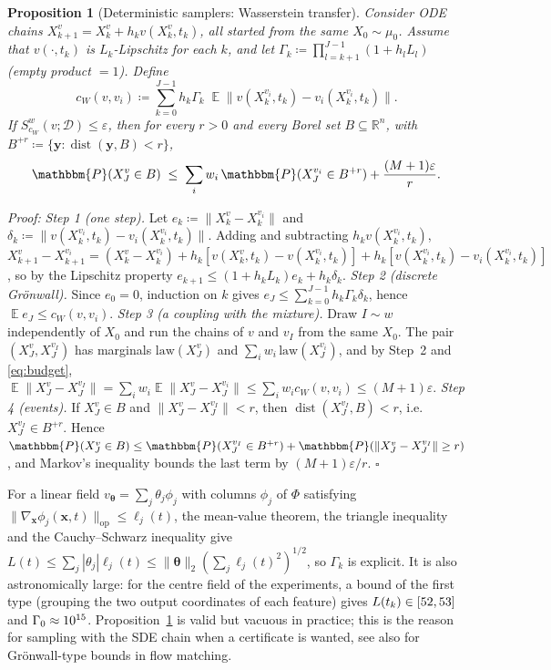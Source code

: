 \documentclass{article}
\DeclareMathOperator{\E}{\mathbb{E}}
\DeclareMathOperator{\dist}{dist}
\newcommand{\RR}{\mathbb{R}}
\newcommand{\cD}{\mathcal{D}}                       %
\newcommand{\bth}{\boldsymbol{\theta}}
\newcommand{\bx}{\mathbf{x}}
\newcommand{\by}{\mathbf{y}}
\theoremstyle{plain}
\newtheorem{proposition}{Proposition}
\begin{document}
\begin{proposition}[Deterministic samplers: Wasserstein transfer]\label{pr:ode}
Consider ODE chains $X^{v}_{k+1}=X^v_k+h_kv(X^v_k,t_k)$, all started from the same
$X_0\sim\mu_0$. Assume that $v(\cdot,t_k)$ is $L_k$-Lipschitz for each $k$, and let
$\Gamma_k\coloneqq\prod_{l=k+1}^{J-1}(1+h_lL_l)$ (empty product $=1$). Define
\[
  c_W(v,v_i)\coloneqq\sum_{k=0}^{J-1}h_k\Gamma_k\;\E\big\|v(X^{v_i}_k,t_k)-v_i(X^{v_i}_k,t_k)\big\| .
\]
If $S^w_{c_W}(v;\cD)\leq\varepsilon$, then for every $r>0$ and every Borel set $B\subseteq\RR^n$,
with $B^{+r}\coloneqq\{\by:\dist(\by,B)<r\}$,
\[
  \mathbbm{P}(X^v_J\in B)\;\leq\;\sum_iw_i\,\mathbbm{P}(X^{v_i}_J\in B^{+r})+\frac{(M+1)\varepsilon}{r}.
\]
\end{proposition}
\textit{Proof:}
\emph{Step 1 (one step).} Let $e_k\coloneqq\|X^v_k-X^{v_i}_k\|$ and
$\delta_k\coloneqq\|v(X^{v_i}_k,t_k)-v_i(X^{v_i}_k,t_k)\|$. Adding and subtracting
$h_kv(X^{v_i}_k,t_k)$,
$X^v_{k+1}-X^{v_i}_{k+1}=(X^v_k-X^{v_i}_k)+h_k[v(X^v_k,t_k)-v(X^{v_i}_k,t_k)]+h_k[v(X^{v_i}_k,t_k)-v_i(X^{v_i}_k,t_k)]$,
so by the Lipschitz property $e_{k+1}\leq(1+h_kL_k)e_k+h_k\delta_k$.
\emph{Step 2 (discrete Gr\"onwall).} Since $e_0=0$, induction on $k$ gives
$e_J\leq\sum_{k=0}^{J-1}h_k\Gamma_k\delta_k$, hence $\E e_J\leq c_W(v,v_i)$.
\emph{Step 3 (a coupling with the mixture).} Draw $I\sim w$ independently of $X_0$ and run the
chains of $v$ and $v_I$ from the same $X_0$. The pair $(X^v_J,X^{v_I}_J)$ has marginals
$\mathrm{law}(X^v_J)$ and $\sum_iw_i\,\mathrm{law}(X^{v_i}_J)$, and by Step~2 and \eqref{eq:budget},
$\E\|X^v_J-X^{v_I}_J\|=\sum_iw_i\E\|X^v_J-X^{v_i}_J\|\leq\sum_iw_ic_W(v,v_i)\leq(M+1)\varepsilon$.
\emph{Step 4 (events).} If $X^v_J\in B$ and $\|X^v_J-X^{v_I}_J\|<r$, then
$\dist(X^{v_I}_J,B)<r$, i.e.\ $X^{v_I}_J\in B^{+r}$. Hence
$\mathbbm{P}(X^v_J\in B)\leq\mathbbm{P}(X^{v_I}_J\in B^{+r})+\mathbbm{P}(\|X^v_J-X^{v_I}_J\|\geq r)$, and
Markov's inequality bounds the last term by $(M+1)\varepsilon/r$. \hfill $\square$

For a linear field $v_{\bth}=\sum_j\theta_j\phi_j$ with columns $\phi_j$ of $\Phi$ satisfying
$\|\nabla_{\bx}\phi_j(\bx,t)\|_{\mathrm{op}}\leq\ell_j(t)$, the mean-value theorem, the triangle
inequality and the Cauchy--Schwarz inequality give
$L(t)\leq\sum_j|\theta_j|\ell_j(t)\leq\|\bth\|_2(\sum_j\ell_j(t)^2)^{1/2}$, so $\Gamma_k$ is explicit. It is
also astronomically large: for the centre field of the experiments, a bound of the first type
(grouping the two output coordinates of each feature) gives $L(t_k)\in[52,53]$ and
$\Gamma_0\approx10^{15}$.
Proposition~\ref{pr:ode} is valid but vacuous in practice; this is the reason for sampling
with the SDE chain when a certificate is wanted, see also \citet{benton2024error} for
Gr\"onwall-type bounds in flow matching.
\end{document}
